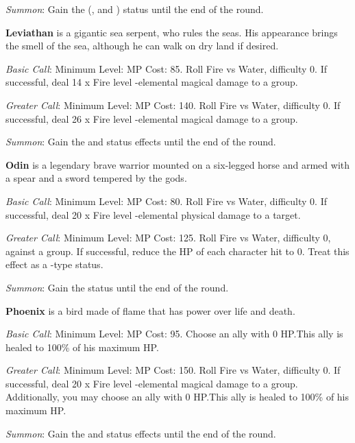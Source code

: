 \begin{multicols}{2}
    \textit{Summon}: Gain the  (,  and ) status until the end of the round.
    
    \textbf{Leviathan} is a gigantic sea serpent, who rules the seas. His appearance brings the smell of the sea, although he can walk on dry land if desired.
    
    \textit{Basic Call}: Minimum Level:  MP Cost: 85. Roll Fire vs Water, difficulty 0. If successful, deal 14 x Fire level -elemental magical damage to a group.
    
    \textit{Greater Call}: Minimum Level:  MP Cost: 140. Roll Fire vs Water, difficulty 0. If successful, deal 26 x Fire level -elemental magical damage to a group.
    
    \textit{Summon}: Gain the   and   status effects until the end of the round.
    
    \textbf{Odin} is a legendary brave warrior mounted on a six-legged horse and armed with a spear and a sword tempered by the gods.
    
    \textit{Basic Call}: Minimum Level:  MP Cost: 80. Roll Fire vs Water, difficulty 0. If successful, deal 20 x Fire level -elemental physical damage to a target.
    
    \textit{Greater Call}: Minimum Level:  MP Cost: 125. Roll Fire vs Water, difficulty 0, against a group. If successful, reduce the HP of each character hit to 0. Treat this effect as a -type status.
    
    \textit{Summon}: Gain the  status until the end of the round.
    
    \textbf{Phoenix} is a bird made of flame that has power over life and death.
    
    \textit{Basic Call}: Minimum Level:  MP Cost: 95. Choose an ally with 0 HP.\@{}This ally is healed to 100\% of his maximum HP.\@{}
    
    \textit{Greater Call}: Minimum Level:  MP Cost: 150. Roll Fire vs Water, difficulty 0. If successful, deal 20 x Fire level -elemental magical damage to a group. Additionally, you may choose an ally with 0 HP.\@{}This ally is healed to 100\% of his maximum HP.\@{}
    
    \textit{Summon}: Gain the  and   status effects until the end of the round.
    

\end{multicols}
